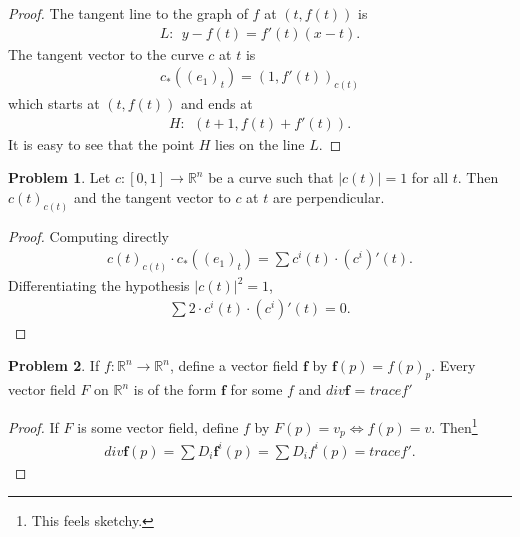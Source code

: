 \documentclass[20pt]{article}
\theoremstyle{plain}
\theoremstyle{definition}
\newtheorem*{problem}{Problem}
\newcommand{\reals}{\mathbb{R}}
\begin{document}
\begin{proof}
  The tangent line to the graph of $f$ at $(t, f(t))$ is 
  \begin{align*}
    L:\ \ y - f(t) = f'(t)(x - t).
  \end{align*}
  The tangent vector to the curve $c$ at $t$ is 
  \begin{align*}
    c_*((e_1)_t) = (1, f'(t))_{c(t)}
  \end{align*}
  which starts at $(t, f(t))$ and ends at 
  \begin{align*}
    H: \ \ (t+1, f(t) + f'(t)).
  \end{align*}
  It is easy to see that the point $H$ lies on the line $L$.
\end{proof}



\begin{problem}
  Let $c: [0, 1] \to \reals^n$ be a curve such that $|c(t)| = 1$ for all $t$.
  Then $c(t)_{c(t)}$ and the tangent vector to $c$ at $t$ are perpendicular.
\end{problem}
\begin{proof}
  Computing directly
  \begin{align*}
    c(t)_{c(t)} \cdot c_*((e_1)_t) = \sum c^i(t) \cdot (c^i)'(t).
  \end{align*}
  Differentiating the hypothesis $|c(t)|^2 = 1$,
  \begin{align*}
    \sum 2 \cdot c^i(t) \cdot (c^i)'(t) = 0.
  \end{align*}
\end{proof}














\begin{problem}
  If $f: \reals^n \to \reals^n$, define a vector  field $\pmb{f}$ by $\pmb{f}(p) = f(p)_p$.
  Every vector  field $F$ on $\reals^n$ is of the form $\pmb{f}$ for
  some $f$ and $div \pmb{f}$ = $trace f'$
\end{problem}

\begin{proof}
  If $F$ is some vector field, define $f$ by $F(p) = v_p \iff f(p) = v$.
  Then\footnote{This feels sketchy.} 
  \begin{align*}
    div\pmb{f}(p) = 
    \sum D_i\pmb{f}^i(p) = 
    \sum D_i f^i(p) = 
    trace f'.
  \end{align*}
\end{proof}
\end{document}
